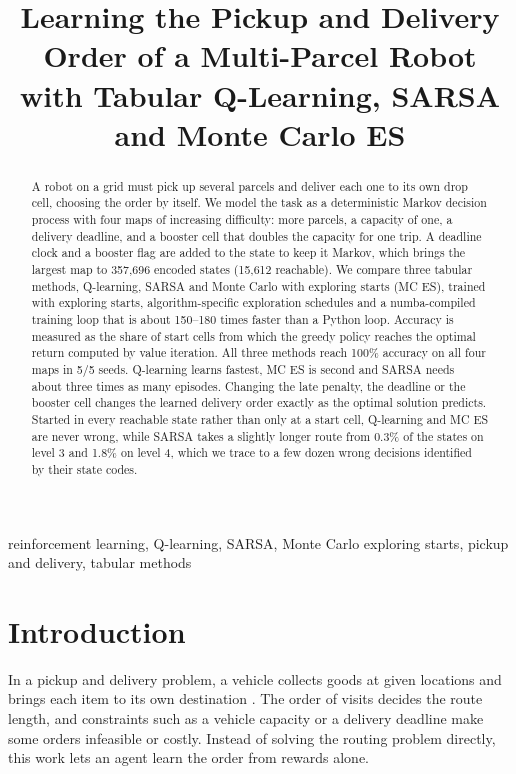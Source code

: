 \documentclass[conference]{IEEEtran}
\begin{document}
\title{Learning the Pickup and Delivery Order of a Multi-Parcel Robot with Tabular Q-Learning, SARSA and Monte Carlo ES}

\author{
}

\maketitle

\begin{abstract}
A robot on a grid must pick up several parcels and deliver each one to its own drop cell, choosing the order by itself. We model the task as a deterministic Markov decision process with four maps of increasing difficulty: more parcels, a capacity of one, a delivery deadline, and a booster cell that doubles the capacity for one trip. A deadline clock and a booster flag are added to the state to keep it Markov, which brings the largest map to 357,696 encoded states (15,612 reachable). We compare three tabular methods, Q-learning, SARSA and Monte Carlo with exploring starts (MC ES), trained with exploring starts, algorithm-specific exploration schedules and a numba-compiled training loop that is about 150--180 times faster than a Python loop. Accuracy is measured as the share of start cells from which the greedy policy reaches the optimal return computed by value iteration. All three methods reach 100\% accuracy on all four maps in 5/5 seeds. Q-learning learns fastest, MC ES is second and SARSA needs about three times as many episodes. Changing the late penalty, the deadline or the booster cell changes the learned delivery order exactly as the optimal solution predicts. Started in every reachable state rather than only at a start cell, Q-learning and MC ES are never wrong, while SARSA takes a slightly longer route from 0.3\% of the states on level 3 and 1.8\% on level 4, which we trace to a few dozen wrong decisions identified by their state codes.
\end{abstract}

\begin{IEEEkeywords}
reinforcement learning, Q-learning, SARSA, Monte Carlo exploring starts, pickup and delivery, tabular methods
\end{IEEEkeywords}

\section{Introduction}
In a pickup and delivery problem, a vehicle collects goods at given locations and brings each item to its own destination \cite{b9}. The order of visits decides the route length, and constraints such as a vehicle capacity or a delivery deadline make some orders infeasible or costly. Instead of solving the routing problem directly, this work lets an agent learn the order from rewards alone.
\end{document}
